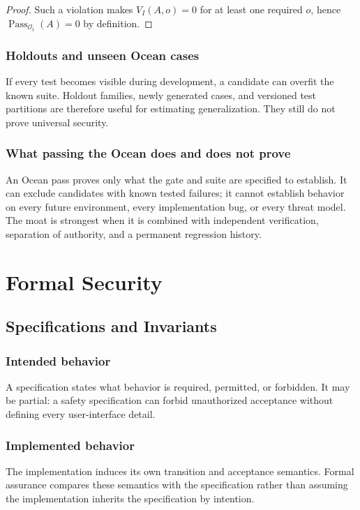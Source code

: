 \documentclass[11pt,oneside]{book}
\theoremstyle{definition}
\theoremstyle{remark}
\begin{document}
\begin{proof}
Such a violation makes $V_I(A,o)=0$ for at least one required $o$, hence $\operatorname{Pass}_{\mathcal O_t}(A)=0$ by definition.
\end{proof}

\section{Holdouts and unseen Ocean cases}
If every test becomes visible during development, a candidate can overfit the known suite. Holdout families, newly generated cases, and versioned test partitions are therefore useful for estimating generalization. They still do not prove universal security.

\section{What passing the Ocean does and does not prove}
An Ocean pass proves only what the gate and suite are specified to establish. It can exclude candidates with known tested failures; it cannot establish behavior on every future environment, every implementation bug, or every threat model. The moat is strongest when it is combined with independent verification, separation of authority, and a permanent regression history.

\part{Formal Security}

\chapter{Specifications and Invariants}
\label{ch:specifications}
\section{Intended behavior}
A specification states what behavior is required, permitted, or forbidden. It may be partial: a safety specification can forbid unauthorized acceptance without defining every user-interface detail.

\section{Implemented behavior}
The implementation induces its own transition and acceptance semantics. Formal assurance compares these semantics with the specification rather than assuming the implementation inherits the specification by intention.
\end{document}
